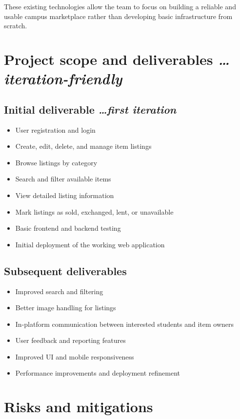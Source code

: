 \documentclass[11pt,a4paper]{article}
\newcommand{\BvrHint}[1]{%
  {\normalfont\normalsize\itshape\hfill #1}}
\begin{document}
These existing technologies allow the team to focus on building a reliable and usable campus marketplace rather than developing basic infrastructure from scratch.
\section{Project scope and deliverables %
\BvrHint{\ldots iteration-friendly}}

\subsection{Initial deliverable %
\BvrHint{\ldots first iteration}}
\begin{itemize}[leftmargin=0.7cm]
    \item User registration and login
    \item Create, edit, delete, and manage item listings
    \item Browse listings by category
    \item Search and filter available items
    \item View detailed listing information
    \item Mark listings as sold, exchanged, lent, or unavailable
    \item Basic frontend and backend testing
    \item Initial deployment of the working web application
\end{itemize}

\subsection{Subsequent deliverables}
\begin{itemize}[leftmargin=0.7cm]
    \item Improved search and filtering
    \item Better image handling for listings
    \item In-platform communication between interested students and item owners
    \item User feedback and reporting features
    \item Improved UI and mobile responsiveness
    \item Performance improvements and deployment refinement
\end{itemize}

\section{Risks and mitigations}
\end{document}
